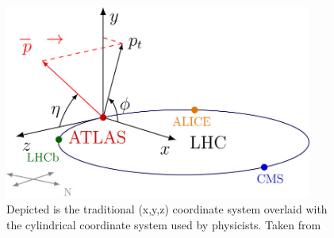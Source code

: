 \begin{figure}
    \centering
    \includegraphics[width=0.9\textwidth]{figures/atlas/atlas_coordinate_system.jpg}
    \caption{Depicted is the traditional (x,y,z) coordinate system overlaid with the cylindrical coordinate system used by physicists. Taken from~\cite{atlas_coordinate_system}}\label{fig:atlas_coordinate_system}
\end{figure}
